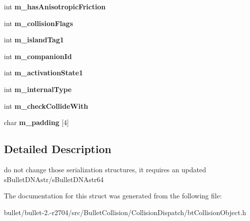\begin{DoxyCompactItemize}
\item 
\hypertarget{structbt_collision_object_float_data_aeaa722487d0cb3de9fd4a178f578fe45}{int {\bfseries m\+\_\+has\+Anisotropic\+Friction}}\label{structbt_collision_object_float_data_aeaa722487d0cb3de9fd4a178f578fe45}

\item 
\hypertarget{structbt_collision_object_float_data_a7c7ef56132794c7b587177ef57736f63}{int {\bfseries m\+\_\+collision\+Flags}}\label{structbt_collision_object_float_data_a7c7ef56132794c7b587177ef57736f63}

\item 
\hypertarget{structbt_collision_object_float_data_ade68696f6f3aafd3f68f45cb837696b1}{int {\bfseries m\+\_\+island\+Tag1}}\label{structbt_collision_object_float_data_ade68696f6f3aafd3f68f45cb837696b1}

\item 
\hypertarget{structbt_collision_object_float_data_a476dda8d18eb7ed8f364aeb10c88b88d}{int {\bfseries m\+\_\+companion\+Id}}\label{structbt_collision_object_float_data_a476dda8d18eb7ed8f364aeb10c88b88d}

\item 
\hypertarget{structbt_collision_object_float_data_a13d87925306d938efdd36bf09629093c}{int {\bfseries m\+\_\+activation\+State1}}\label{structbt_collision_object_float_data_a13d87925306d938efdd36bf09629093c}

\item 
\hypertarget{structbt_collision_object_float_data_a265160a71ca617fbac9d9aced0d3da22}{int {\bfseries m\+\_\+internal\+Type}}\label{structbt_collision_object_float_data_a265160a71ca617fbac9d9aced0d3da22}

\item 
\hypertarget{structbt_collision_object_float_data_a82f62332fbae3214f10bce361bee417d}{int {\bfseries m\+\_\+check\+Collide\+With}}\label{structbt_collision_object_float_data_a82f62332fbae3214f10bce361bee417d}

\item 
\hypertarget{structbt_collision_object_float_data_a40088e78c5f7a5ed26eed4c11938a5a6}{char {\bfseries m\+\_\+padding} \mbox{[}4\mbox{]}}\label{structbt_collision_object_float_data_a40088e78c5f7a5ed26eed4c11938a5a6}

\end{DoxyCompactItemize}


\subsection{Detailed Description}
do not change those serialization structures, it requires an updated s\+Bullet\+D\+N\+Astr/s\+Bullet\+D\+N\+Astr64 

The documentation for this struct was generated from the following file\+:\begin{DoxyCompactItemize}
\item 
bullet/bullet-\/2.-\/r2704/src/\+Bullet\+Collision/\+Collision\+Dispatch/bt\+Collision\+Object.\+h\end{DoxyCompactItemize}
